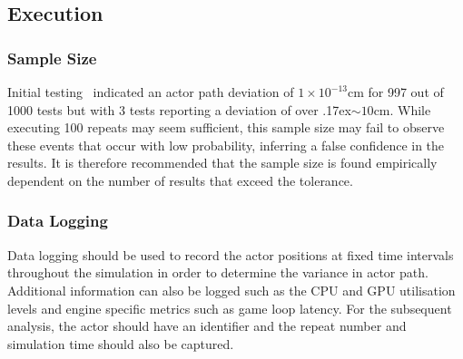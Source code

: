 \documentclass[letterpaper, 10 pt, journal, twoside]{IEEEtran}
\begin{document}
\subsection{Execution}


\subsubsection{Sample Size}
Initial testing~\cite{TSLUnrealEngineTesting} indicated an actor path deviation of $1\times10^{-13}$cm for 997 out of 1000 tests but with 3 tests reporting a deviation of over {\raise.17ex\hbox{$\scriptstyle\sim$}}$10$cm. While executing 100 repeats may seem sufficient, this sample size may fail to observe these events that occur with low probability, inferring a false confidence in the results. It is therefore recommended that the sample size is found empirically dependent on the number of results that exceed the tolerance. 

\subsubsection{Data Logging}
Data logging should be used to record the actor positions at fixed time intervals throughout the simulation in order to determine the variance in actor path. Additional information can also be logged such as the CPU and GPU utilisation levels and engine specific metrics such as game loop latency.
For the subsequent analysis, the actor should have an identifier and the repeat number and simulation time should also be captured. 
\end{document}
